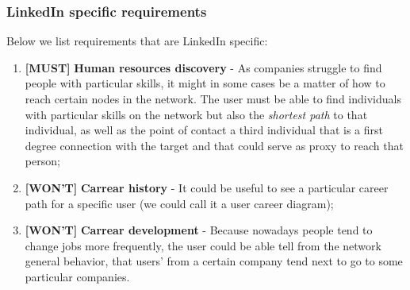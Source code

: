 \subsubsection*{LinkedIn specific requirements}

Below we list requirements that are LinkedIn specific:

\begin{enumerate}
    \item \textbf{[MUST]} \textbf{Human resources discovery} - As companies struggle to find people with particular skills, it might in some cases be a matter of how to reach certain nodes in the network. The user must be able to find individuals with particular skills on the network but also the \textit{shortest path} to that individual, as well as the point of contact a third individual that is a first degree connection with the target and that could serve as proxy to reach that person;
    \item \textbf{[WON'T]} \textbf{Carrear history} - It could be useful to see a particular career path for a specific user (we could call it a user career diagram);
    \item \textbf{[WON'T]} \textbf{Carrear development} - Because nowadays people tend to change jobs more frequently, the user could be able tell from the network general behavior, that users' from a certain company tend next to go to some particular companies.
\end{enumerate}
